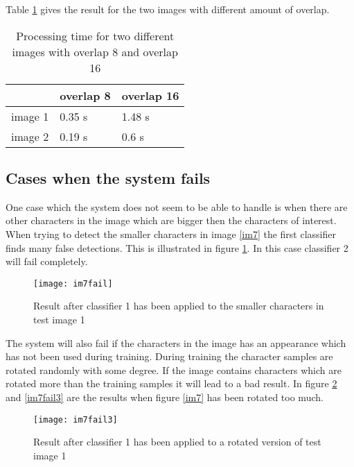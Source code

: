 Table \ref{table:result test} gives the result for the two images with different amount of overlap.

\begin{table}[H]
\begin{center}
     \begin{tabular}{| l | l | | l |}
     \hline
       & overlap 8 & overlap 16 \\ \hline
     image 1 & 0.35 s & 1.48 s\\ \hline
     image 2 & 0.19 s & 0.6 s \\ \hline
     \end{tabular}
\end{center}
\label{table:result test}
\caption{Processing time for two different images with overlap 8 and overlap 16}
\end{table}

\subsection{Cases when the system fails}
\label{sec:Cases when the system fails}
One case which the system does not seem to be able to handle is when there are other characters in the image which are bigger then the characters of interest. When trying to detect the smaller characters in image \ref{im7} the first classifier finds many false detections. This is illustrated in figure \ref{im7fail}. In this case classifier 2 will fail completely.

\begin{figure}[H]
\centering
	\texttt{[image: im7fail]}
	\caption{Result after classifier 1 has been applied to the smaller characters in test image 1}
	\label{im7fail}
\end{figure}
 
The system will also fail if the characters in the image has an appearance which has not been used during training. During training the character samples are rotated randomly with some degree. If the image contains characters which are rotated more than the training samples it will lead to a bad result. In figure \ref{im7fail2} and \ref{im7fail3} are the results when figure \ref{im7} has been rotated too much.

\begin{figure}[H]
\centering
	\texttt{[image: im7fail3]}
	\caption{Result after classifier 1 has been applied to a rotated version of test image 1}
	\label{im7fail2}
\end{figure}

